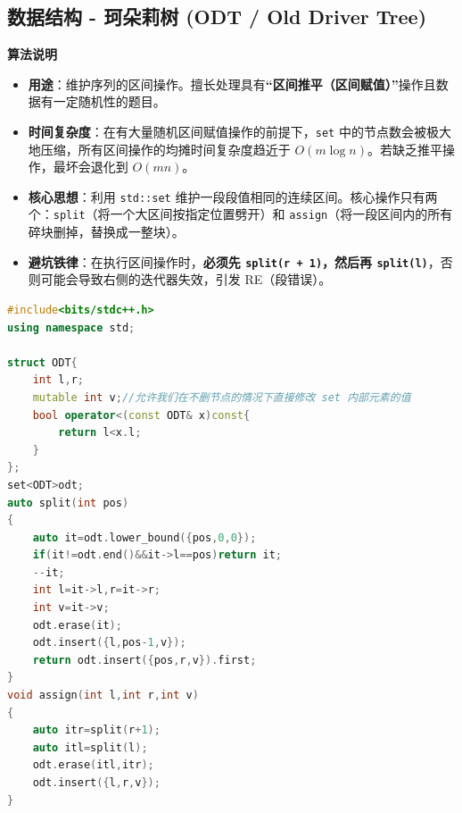 \documentclass[10pt,landscape,a4paper]{article}
\begin{document}
\begin{multicols*}{3}
\subsection*{数据结构 - 珂朵莉树 (ODT / Old Driver Tree)}
\par\addvspace{0.7ex}\noindent\textbf{算法说明}\par\nobreak
\begin{itemize}
\item \textbf{用途}：维护序列的区间操作。擅长处理具有\textbf{“区间推平（区间赋值）”}操作且数据有一定随机性的题目。
\item \textbf{时间复杂度}：在有大量随机区间赋值操作的前提下，\texttt{s\allowbreak{}e\allowbreak{}t} 中的节点数会被极大地压缩，所有区间操作的均摊时间复杂度趋近于 $O(m \log n)$。若缺乏推平操作，最坏会退化到 $O(mn)$。
\item \textbf{核心思想}：利用 \texttt{s\allowbreak{}t\allowbreak{}d\allowbreak{}:\allowbreak{}:\allowbreak{}s\allowbreak{}e\allowbreak{}t} 维护一段段值相同的连续区间。核心操作只有两个：\texttt{s\allowbreak{}p\allowbreak{}l\allowbreak{}i\allowbreak{}t}（将一个大区间按指定位置劈开）和 \texttt{a\allowbreak{}s\allowbreak{}s\allowbreak{}i\allowbreak{}g\allowbreak{}n}（将一段区间内的所有碎块删掉，替换成一整块）。
\item \textbf{避坑铁律}：在执行区间操作时，\textbf{必须先 \texttt{s\allowbreak{}p\allowbreak{}l\allowbreak{}i\allowbreak{}t\allowbreak{}(\allowbreak{}r\allowbreak{} \allowbreak{}+\allowbreak{} \allowbreak{}1\allowbreak{})}，然后再 \texttt{s\allowbreak{}p\allowbreak{}l\allowbreak{}i\allowbreak{}t\allowbreak{}(\allowbreak{}l\allowbreak{})}}，否则可能会导致右侧的迭代器失效，引发 RE（段错误）。
\end{itemize}
\par{}\par
\begin{lstlisting}[language=C++]
#include<bits/stdc++.h>
using namespace std;

struct ODT{
    int l,r;
    mutable int v;//允许我们在不删节点的情况下直接修改 set 内部元素的值
    bool operator<(const ODT& x)const{
        return l<x.l;
    }
};
set<ODT>odt;
auto split(int pos)
{
    auto it=odt.lower_bound({pos,0,0});
    if(it!=odt.end()&&it->l==pos)return it;
    --it;
    int l=it->l,r=it->r;
    int v=it->v;
    odt.erase(it);
    odt.insert({l,pos-1,v});
    return odt.insert({pos,r,v}).first;
}
void assign(int l,int r,int v)
{
    auto itr=split(r+1);
    auto itl=split(l);
    odt.erase(itl,itr);
    odt.insert({l,r,v});
}


\end{lstlisting}
\end{multicols*}
\end{document}
